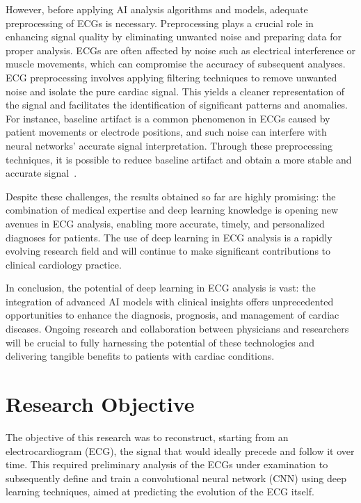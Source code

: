 \documentclass[12pt,italian]{report}
\begin{document}
However, before applying AI analysis algorithms and models, adequate preprocessing of ECGs is necessary. Preprocessing plays a crucial role in enhancing signal quality by eliminating unwanted noise and preparing data for proper analysis. ECGs are often affected by noise such as electrical interference or muscle movements, which can compromise the accuracy of subsequent analyses. ECG preprocessing involves applying filtering techniques to remove unwanted noise and isolate the pure cardiac signal. This yields a cleaner representation of the signal and facilitates the identification of significant patterns and anomalies. For instance, baseline artifact is a common phenomenon in ECGs caused by patient movements or electrode positions, and such noise can interfere with neural networks' accurate signal interpretation. Through these preprocessing techniques, it is possible to reduce baseline artifact and obtain a more stable and accurate signal~\cite{use}.

Despite these challenges, the results obtained so far are highly promising: the combination of medical expertise and deep learning knowledge is opening new avenues in ECG analysis, enabling more accurate, timely, and personalized diagnoses for patients. The use of deep learning in ECG analysis is a rapidly evolving research field and will continue to make significant contributions to clinical cardiology practice.

In conclusion, the potential of deep learning in ECG analysis is vast: the integration of advanced AI models with clinical insights offers unprecedented opportunities to enhance the diagnosis, prognosis, and management of cardiac diseases. Ongoing research and collaboration between physicians and researchers will be crucial to fully harnessing the potential of these technologies and delivering tangible benefits to patients with cardiac conditions.

\section{Research Objective}
\label{sec:objective}

The objective of this research was to reconstruct, starting from an electrocardiogram (ECG), the signal that would ideally precede and follow it over time. This required preliminary analysis of the ECGs under examination to subsequently define and train a convolutional neural network (CNN) using deep learning techniques, aimed at predicting the evolution of the ECG itself.
\end{document}
